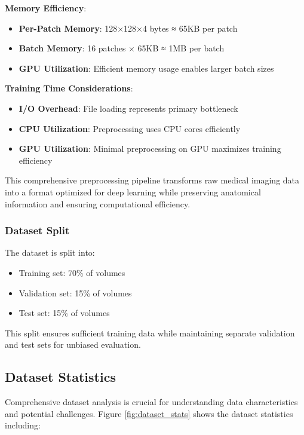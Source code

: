 \documentclass[12pt,a4paper]{article}
\begin{document}
\textbf{Memory Efficiency}:
\begin{itemize}
    \item \textbf{Per-Patch Memory}: 128×128×4 bytes ≈ 65KB per patch
    \item \textbf{Batch Memory}: 16 patches × 65KB ≈ 1MB per batch
    \item \textbf{GPU Utilization}: Efficient memory usage enables larger batch sizes
\end{itemize}

\textbf{Training Time Considerations}:
\begin{itemize}
    \item \textbf{I/O Overhead}: File loading represents primary bottleneck
    \item \textbf{CPU Utilization}: Preprocessing uses CPU cores efficiently
    \item \textbf{GPU Utilization}: Minimal preprocessing on GPU maximizes training efficiency
\end{itemize}

This comprehensive preprocessing pipeline transforms raw medical imaging data into a format optimized for deep learning while preserving anatomical information and ensuring computational efficiency.

\subsubsection{Dataset Split}
The dataset is split into:
\begin{itemize}
    \item Training set: 70\% of volumes
    \item Validation set: 15\% of volumes
    \item Test set: 15\% of volumes
\end{itemize}

This split ensures sufficient training data while maintaining separate validation and test sets for unbiased evaluation.

\subsection{Dataset Statistics}

Comprehensive dataset analysis is crucial for understanding data characteristics and potential challenges. Figure \ref{fig:dataset_stats} shows the dataset statistics including:
\end{document}
